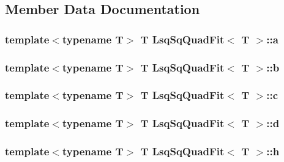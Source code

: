 \subsection{Member Data Documentation}
\subsubsection[{\texorpdfstring{a}{a}}]{\setlength{\rightskip}{0pt plus 5cm}template$<$typename T$>$ T {\bf Lsq\+Sq\+Quad\+Fit}$<$ T $>$\+::a}\hypertarget{class_lsq_sq_quad_fit_aed5761aec0a7a0f48c00668e07018f5f}{}\label{class_lsq_sq_quad_fit_aed5761aec0a7a0f48c00668e07018f5f}
\subsubsection[{\texorpdfstring{b}{b}}]{\setlength{\rightskip}{0pt plus 5cm}template$<$typename T$>$ T {\bf Lsq\+Sq\+Quad\+Fit}$<$ T $>$\+::b}\hypertarget{class_lsq_sq_quad_fit_a2152e5451babc95de72e22235c506207}{}\label{class_lsq_sq_quad_fit_a2152e5451babc95de72e22235c506207}
\subsubsection[{\texorpdfstring{c}{c}}]{\setlength{\rightskip}{0pt plus 5cm}template$<$typename T$>$ T {\bf Lsq\+Sq\+Quad\+Fit}$<$ T $>$\+::c}\hypertarget{class_lsq_sq_quad_fit_a9339f928660fda5f1d67bbe93da0df5e}{}\label{class_lsq_sq_quad_fit_a9339f928660fda5f1d67bbe93da0df5e}
\subsubsection[{\texorpdfstring{d}{d}}]{\setlength{\rightskip}{0pt plus 5cm}template$<$typename T$>$ T {\bf Lsq\+Sq\+Quad\+Fit}$<$ T $>$\+::d}\hypertarget{class_lsq_sq_quad_fit_a2fbec8bc8653a177da1f7d5db77a9c0a}{}\label{class_lsq_sq_quad_fit_a2fbec8bc8653a177da1f7d5db77a9c0a}
\subsubsection[{\texorpdfstring{h}{h}}]{\setlength{\rightskip}{0pt plus 5cm}template$<$typename T$>$ T {\bf Lsq\+Sq\+Quad\+Fit}$<$ T $>$\+::h}\hypertarget{class_lsq_sq_quad_fit_a6e53e031b4b75e7c5dba305b47eb3c42}{}\label{class_lsq_sq_quad_fit_a6e53e031b4b75e7c5dba305b47eb3c42}
